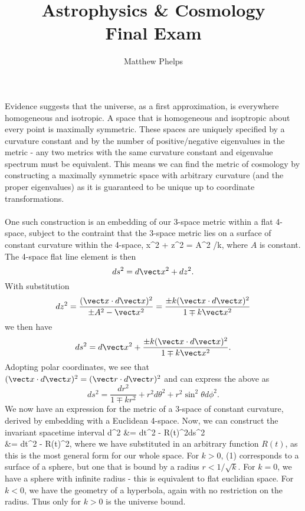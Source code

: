 \documentclass[10pt,letterpaper]{article}
\title{Astrophysics \& Cosmology\\Final Exam}
\author{Matthew Phelps}
\date{}
\begin{document}
\maketitle

\benum

\item 
Evidence suggests that the universe, as a first approximation, is everywhere homogeneous and isotropic. A space that is homogeneous and isoptropic about every point is maximally symmetric. These spaces are uniquely specified by a curvature constant and by the number of positive/negative eigenvalues in the metric - any two metrics with the same curvature constant and eigenvalue spectrum must be equivalent. This means we can find the metric of cosmology by constructing a maximally symmetric space with arbitrary curvature (and the proper eigenvalues) as it is guaranteed to be unique up to coordinate transformations. \\ \\
One such construction is an embedding of our 3-space metric within a flat 4-space, subject to the contraint that the 3-space metric lies on a surface of constant curvature within the 4-space,
\be
	\vect x^2 + z^2 = \pm A^2 \equiv {}/k,
\ee
where $A$ is constant. 
The 4-space flat line element is then
\[
	ds^2 = d\vect x ^2 + dz^2 .
\]
With substitution
\[
	dz^2 = \frac{ (\vect x \cdot d\vect x)^2}{\pm A^2 - \vect x^2} = \frac{ \pm k(\vect x \cdot d\vect x)^2}{ 1 \mp k \vect x^2}
\]
we then have
\[
	ds^2 = d\vect x^2 +  \frac{ \pm k(\vect x \cdot d\vect x)^2}{ 1 \mp k \vect x^2}.
\]
Adopting polar coordinates, we see that $(\vect x\cdot d\vect x)^2 = (\vect r\cdot d\vect r)^2$ and can express the above as
\[
	ds^2 = \frac{dr^2}{1\mp kr^2} + r^2d\theta^2+ r^2 \sin^2\theta d\phi^2 .
\]
We now have an expression for the metric of a 3-space of constant curvature, derived by embedding with a Euclidean 4-space. Now, we can construct the invariant spacetime interval
\ba
	d\tau^2 &= dt^2 - R(t)^2ds^2\\
	&= dt^2 - R(t)^2,
\ea
where we have substituted in an arbitrary function $R(t)$, as this is the most general form for our whole space. For $k>0$, (1) corresponds to a surface of a sphere, but one that is bound by a radius $r<1/\sqrt k$. For $k =0$, we have a sphere with infinite radius - this is equivalent to flat euclidian space. For $k<0$, we have the geometry of a hyperbola, again with no restriction on the radius. Thus only for $k>0$ is the universe bound.
\end{document}
